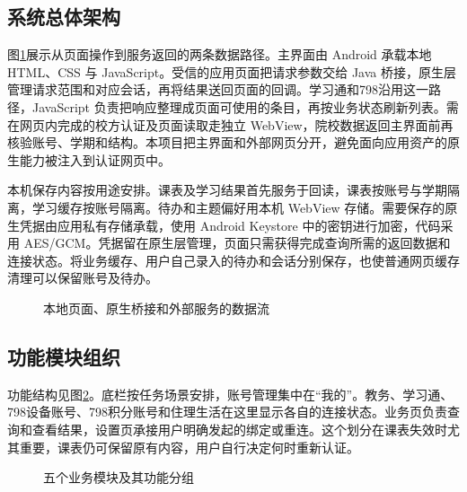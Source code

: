 \subsection{系统总体架构}
图\ref{fig:arch}展示从页面操作到服务返回的两条数据路径。主界面由 Android 承载本地 HTML、CSS 与 JavaScript。受信的应用页面把请求参数交给 Java 桥接，原生层管理请求范围和对应会话，再将结果送回页面的回调。学习通和798沿用这一路径，JavaScript 负责把响应整理成页面可使用的条目，再按业务状态刷新列表。需在网页内完成的校方认证及页面读取走独立 WebView，院校数据返回主界面前再核验账号、学期和结构。本项目把主界面和外部网页分开，避免面向应用资产的原生能力被注入到认证网页中。

本机保存内容按用途安排。课表及学习结果首先服务于回读，课表按账号与学期隔离，学习缓存按账号隔离。待办和主题偏好用本机 WebView 存储。需要保存的原生凭据由应用私有存储承载，使用 Android Keystore 中的密钥进行加密，代码采用 AES/GCM。凭据留在原生层管理，页面只需获得完成查询所需的返回数据和连接状态。将业务缓存、用户自己录入的待办和会话分别保存，也使普通网页缓存清理可以保留账号及待办。

\begin{figure}[htbp]
\centering
\caption{本地页面、原生桥接和外部服务的数据流}\label{fig:arch}
\end{figure}

\subsection{功能模块组织}
功能结构见图\ref{fig:modules}。底栏按任务场景安排，账号管理集中在“我的”。教务、学习通、798设备账号、798积分账号和住理生活在这里显示各自的连接状态。业务页负责查询和查看结果，设置页承接用户明确发起的绑定或重连。这个划分在课表失效时尤其重要，课表仍可保留原有内容，用户自行决定何时重新认证。

\begin{figure}[htbp]
\centering
\caption{五个业务模块及其功能分组}\label{fig:modules}
\end{figure}
